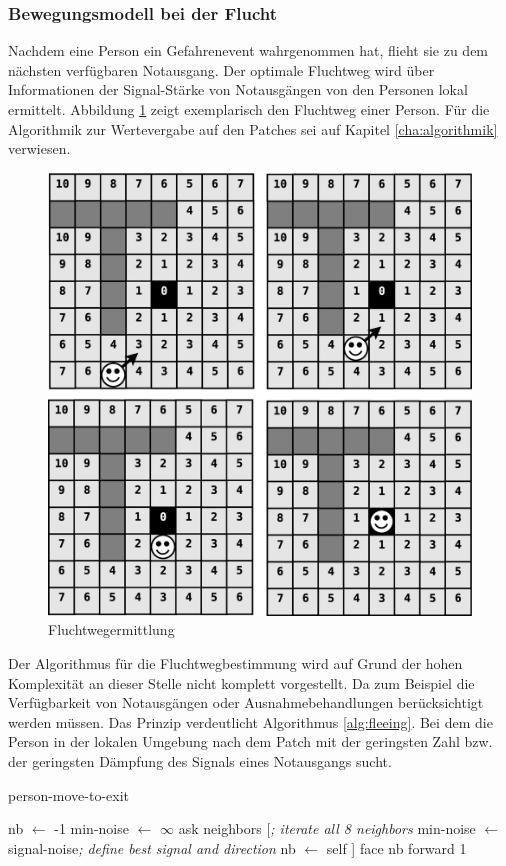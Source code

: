 \subsubsection{Bewegungsmodell bei der Flucht}
\label{sec:move_to_exit}

Nachdem eine Person ein Gefahrenevent wahrgenommen hat, flieht sie zu dem nächsten verfügbaren Notausgang. Der optimale Fluchtweg wird über Informationen der Signal-Stärke von Notausgängen von den Personen lokal ermittelt. Abbildung \ref{fig:fleeing} zeigt exemplarisch den Fluchtweg einer Person. Für die Algorithmik zur Wertevergabe auf den Patches sei auf Kapitel \ref{cha:algorithmik} verwiesen. 

\begin{figure}[!ht]
\centering
\includegraphics[height=0.65\textwidth]{simulationsumgebung/fleeing}
\caption{Fluchtwegermittlung}
\label{fig:fleeing}
\end{figure}

Der Algorithmus für die Fluchtwegbestimmung wird auf Grund der hohen Komplexität an dieser Stelle nicht komplett vorgestellt. Da zum Beispiel die Verfügbarkeit von Notausgängen oder Ausnahmebehandlungen berücksichtigt werden müssen. Das Prinzip verdeutlicht Algorithmus \ref{alg:fleeing}. Bei dem die Person in der lokalen Umgebung nach dem Patch mit der geringsten Zahl bzw. der geringsten Dämpfung des Signals eines Notausgangs sucht. 

\begin{algorithm}
\caption{person-move-to-exit}
\label{alg:fleeing}
\begin{algorithmic} 
\STATE nb $\leftarrow$ -1
\STATE min-noise $\leftarrow$ $\infty$
\STATE ask neighbors [\hfill\emph{; iterate all 8 neighbors}
\STATE min-noise $\leftarrow$ signal-noise\hfill\emph{; define best signal and direction}
\STATE nb $\leftarrow$ self
\ENDIF 
\STATE ]
\STATE face nb
\STATE forward 1
\end{algorithmic}
\end{algorithm}




